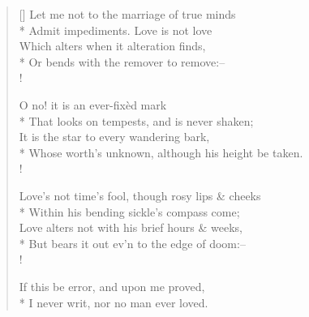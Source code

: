 \documentclass[MAIN]{subfiles}
\begin{document}
\settowidth{\versewidth}{Let me not to the marriage of true minds}
\begin{verse}[\versewidth]
Let me not to the marriage of true minds\\*
Admit impediments. Love is not love\\
Which alters when it alteration finds,\\*
Or bends with the remover to remove:--\\!

O no! it is an ever-fix\`ed mark\\*
That looks on tempests, and is never shaken;\\
It is the star to every wandering bark,\\*
Whose worth's unknown, although his height be taken.\\!

Love's not time's fool, though rosy lips \& cheeks\\*
Within his bending sickle's compass come;\\
Love alters not with his brief hours \& weeks,\\*
But bears it out ev'n to the edge of doom:--\\!

If this be error, and upon me proved,\\*
I never writ, nor no man ever loved.
\end{verse}
\end{document}
